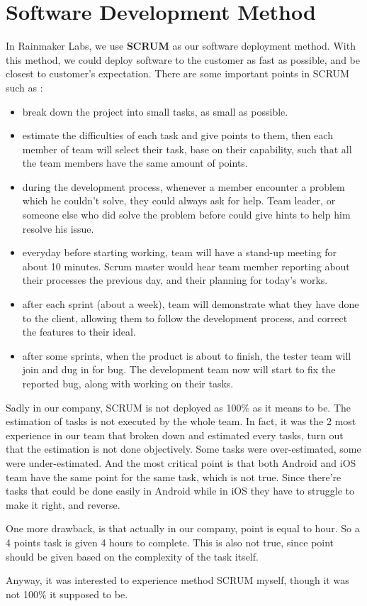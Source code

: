 \chapter{Software Development Method}

In Rainmaker Labs, we use \textbf{SCRUM} as our software deployment method. With this method, we could deploy software to the customer as fast as possible, and be closest to customer's expectation. There are some important points in SCRUM such as :

\begin{itemize}
	\item break down the project into small tasks, as small as possible.
	\item estimate the difficulties of each task and give points to them, then each member of team will select their task, base on their capability, such that all the team members have the same amount of points.
	\item during the development process, whenever a member encounter a problem which he couldn't solve, they could always ask for help. Team leader, or someone else who did solve the problem before could give hints to help him resolve his issue.
	\item everyday before starting working, team will have a stand-up meeting for about 10 minutes. Scrum master would hear team member reporting about their processes the previous day, and their planning for today's works. 
	\item after each sprint (about a week), team will demonstrate what they have done to the client, allowing them to follow the development process, and correct the features to their ideal.
	\item after some sprints, when the product is about to finish, the tester team will join and dug in for bug. The development team now will start to fix the reported bug, along with working on their tasks.
\end{itemize}

Sadly in our company, SCRUM is not deployed as 100\% as it means to be. The estimation of tasks is not executed by the whole team. In fact, it was the 2 most experience in our team that broken down and estimated every tasks, turn out that the estimation is not done objectively. Some tasks were over-estimated, some were under-estimated. And the most critical point is that both Android and iOS team have the same point for the same task, which is not true. Since there're tasks that could be done easily in Android while in iOS they have to struggle to make it right, and reverse. 

One more drawback, is that actually in our company, point is equal to hour. So a 4 points task is given 4 hours to complete. This is also not true, since point should be given based on the complexity of the task itself. 

Anyway, it was interested to experience method SCRUM myself, though it was not 100\% it supposed to be. 